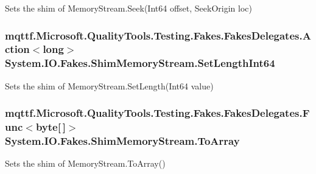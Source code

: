 Sets the shim of Memory\-Stream.\-Seek(\-Int64 offset, Seek\-Origin loc)

\hypertarget{class_system_1_1_i_o_1_1_fakes_1_1_shim_memory_stream_ae55e91f9ba74561bd753f3ce29c66b38}{
\subsubsection[{Set\-Length\-Int64}]{\setlength{\rightskip}{0pt plus 5cm}mqttf.\-Microsoft.\-Quality\-Tools.\-Testing.\-Fakes.\-Fakes\-Delegates.\-Action$<$long$>$ System.\-I\-O.\-Fakes.\-Shim\-Memory\-Stream.\-Set\-Length\-Int64\hspace{0.3cm}{\ttfamily [set]}}}\label{class_system_1_1_i_o_1_1_fakes_1_1_shim_memory_stream_ae55e91f9ba74561bd753f3ce29c66b38}


Sets the shim of Memory\-Stream.\-Set\-Length(\-Int64 value)

\hypertarget{class_system_1_1_i_o_1_1_fakes_1_1_shim_memory_stream_abb6e5adf4551663163706361fb977e58}{
\subsubsection[{To\-Array}]{\setlength{\rightskip}{0pt plus 5cm}mqttf.\-Microsoft.\-Quality\-Tools.\-Testing.\-Fakes.\-Fakes\-Delegates.\-Func$<$byte\mbox{[}$\,$\mbox{]}$>$ System.\-I\-O.\-Fakes.\-Shim\-Memory\-Stream.\-To\-Array\hspace{0.3cm}{\ttfamily [set]}}}\label{class_system_1_1_i_o_1_1_fakes_1_1_shim_memory_stream_abb6e5adf4551663163706361fb977e58}


Sets the shim of Memory\-Stream.\-To\-Array()

